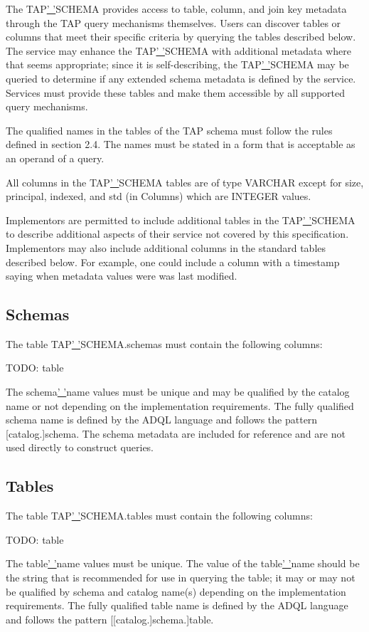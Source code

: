 \documentclass[11pt,a4paper]{ivoa}
\begin{document}
{The TAP\underline{' '}SCHEMA provides access to table, column, and join key 
metadata through the TAP query mechanisms themselves. Users can discover tables 
or columns that meet their specific criteria by querying the tables described 
below.  The service may enhance the TAP\underline{' '}SCHEMA with additional 
metadata where that seems appropriate; since it is self-describing, the 
TAP\underline{' '}SCHEMA may be queried to determine if any extended schema 
metadata is defined by the service. Services must provide these tables and make 
them accessible by all supported query mechanisms.

The qualified names in the tables of the TAP schema must follow the rules 
defined in section 2.4. The names must be stated in a form that is acceptable as 
an operand of a query.

All columns in the TAP\underline{' '}SCHEMA tables are of type VARCHAR except 
for size,  principal, indexed, and std (in Columns) which are INTEGER values.

Implementors are permitted to include additional tables in the 
TAP\underline{' '}SCHEMA to describe additional aspects of their service not 
covered by this specification. Implementors may also include additional columns 
in the standard tables described below. For example, one could include a column 
with a timestamp saying when metadata values were was last modified.

\subsection{Schemas}
The table TAP\underline{' '}SCHEMA.schemas must contain the following columns:

TODO: table

The schema\underline{' '}name values must be unique and may be qualified by the 
catalog name or not depending on the implementation requirements. The fully 
qualified schema name is defined by the ADQL language and  follows the pattern 
[catalog.]schema. The schema metadata are included for reference and are not 
used directly to construct queries.

\subsection{Tables}
The table TAP\underline{' '}SCHEMA.tables must contain the following columns:

TODO: table

The table\underline{' '}name values must be unique. The value of the 
table\underline{' '}name should be the string that is recommended for use in 
querying the table; it may or may not be qualified by schema and catalog name(s) 
depending on the implementation requirements. The fully qualified table name is 
defined by the ADQL language and follows the pattern [[catalog.]schema.]table. 

}
\end{document}
